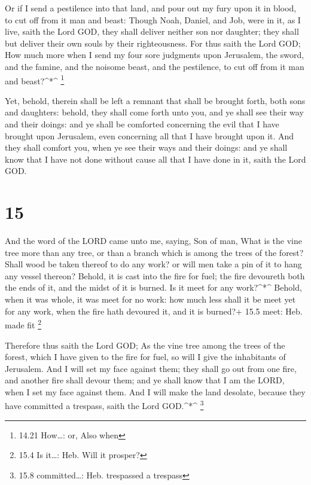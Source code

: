  Or if I send a pestilence into that land, and pour out my
fury upon it in blood, to cut off from it man and beast: 
Though Noah, Daniel, and Job, were in it, as I live, saith the Lord GOD,
they shall deliver neither son nor daughter; they shall but deliver
their own souls by their righteousness.  For thus saith the
Lord GOD; How much more when I send my four sore judgments upon
Jerusalem, the sword, and the famine, and the noisome beast, and the
pestilence, to cut off from it man and beast?\^{}*\^{} \footnote{14.21
  How\ldots: or, Also when}

 Yet, behold, therein shall be left a remnant that shall be
brought forth, both sons and daughters: behold, they shall come forth
unto you, and ye shall see their way and their doings: and ye shall be
comforted concerning the evil that I have brought upon Jerusalem, even
concerning all that I have brought upon it.  And they shall
comfort you, when ye see their ways and their doings: and ye shall know
that I have not done without cause all that I have done in it, saith the
Lord GOD.

\hypertarget{section-14}{%
\section{15}\label{section-14}}

 And the word of the LORD came unto me, saying, 
Son of man, What is the vine tree more than any tree, or than a branch
which is among the trees of the forest?  Shall wood be taken
thereof to do any work? or will men take a pin of it to hang any vessel
thereon?  Behold, it is cast into the fire for fuel; the
fire devoureth both the ends of it, and the midst of it is burned. Is it
meet for any work?\^{}*\^{}  Behold, when it was whole, it
was meet for no work: how much less shall it be meet yet for any work,
when the fire hath devoured it, and it is burned?+ 15.5 meet: Heb. made
fit \footnote{15.4 Is it\ldots: Heb. Will it prosper?}

 Therefore thus saith the Lord GOD; As the vine tree among
the trees of the forest, which I have given to the fire for fuel, so
will I give the inhabitants of Jerusalem.  And I will set my
face against them; they shall go out from one fire, and another fire
shall devour them; and ye shall know that I am the LORD, when I set my
face against them.  And I will make the land desolate,
because they have committed a trespass, saith the Lord GOD.\^{}*\^{}
\footnote{15.8 committed\ldots: Heb. trespassed a trespass}

